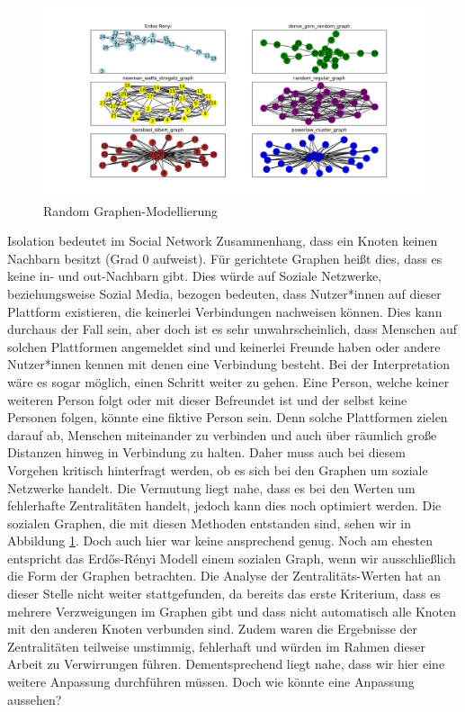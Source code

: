 \FloatBarrier
\begin{figure}[h!]
    \centering
    \hspace*{-1.5cm}
    \includegraphics[width=1.2\textwidth]{Graphics/6Random.png}
    \caption{Random Graphen-Modellierung}
    \label{RandomGraphen}
\end{figure}

\newpage
Isolation bedeutet im Social Network Zusammenhang, dass ein Knoten keinen Nachbarn besitzt (Grad $0$ aufweist).
Für gerichtete Graphen heißt dies, dass es keine in- und out-Nachbarn gibt. Dies würde auf Soziale Netzwerke, beziehungsweise Sozial Media, bezogen bedeuten, dass Nutzer*innen auf dieser Plattform existieren, die keinerlei Verbindungen nachweisen können. Dies kann durchaus der Fall sein, aber doch ist es sehr unwahrscheinlich, dass Menschen auf solchen Plattformen angemeldet sind und keinerlei Freunde haben oder andere Nutzer*innen kennen mit denen eine Verbindung besteht. Bei der Interpretation wäre es sogar möglich, einen Schritt weiter zu gehen. Eine Person, welche keiner weiteren Person folgt oder mit dieser Befreundet ist und der selbst keine Personen folgen, könnte eine fiktive Person sein. Denn solche Plattformen zielen darauf ab, Menschen miteinander zu verbinden und auch über räumlich große Distanzen hinweg in Verbindung zu halten. Daher muss auch bei diesem Vorgehen kritisch hinterfragt werden, ob es sich bei den Graphen um soziale Netzwerke handelt. Die Vermutung liegt nahe, dass es bei den Werten um fehlerhafte Zentralitäten handelt, jedoch kann dies noch optimiert werden.
Die sozialen Graphen, die mit diesen Methoden entstanden sind, sehen wir in Abbildung \ref{RandomGraphen}. Doch auch hier war keine ansprechend genug. Noch am ehesten entspricht das Erdős-Rényi Modell einem sozialen Graph, wenn wir ausschließlich die Form der Graphen betrachten. Die Analyse der Zentralitäts-Werten hat an dieser Stelle nicht weiter stattgefunden, da bereits das erste Kriterium, dass es mehrere Verzweigungen im Graphen gibt und dass nicht automatisch alle Knoten mit den anderen Knoten verbunden sind. Zudem waren die Ergebnisse der Zentralitäten teilweise unstimmig, fehlerhaft und würden im Rahmen dieser Arbeit zu Verwirrungen führen. Dementsprechend liegt nahe, dass wir hier eine weitere Anpassung durchführen müssen. Doch wie könnte eine Anpassung aussehen? 

